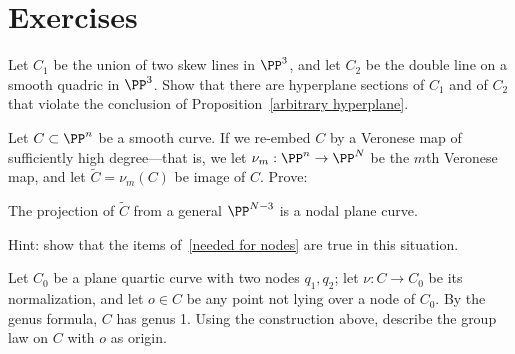 \section{Exercises}
\begin{exercise}\label{{arbitrary hyperplane examples}}
Let $C_1$ be the union of two skew lines in $\PP^3$, and let $C_2$ be the double line on a smooth quadric in $\PP^3$.
Show that there are hyperplane sections of $C_1$ and of $C_2$ that violate the conclusion of Proposition~\ref{arbitrary hyperplane}.
\end{exercise}

\begin{exercise}

Let $C\subset \PP^n$ be a smooth curve. If we re-embed $C$ by a Veronese map of sufficiently high degree---that is, we let $\nu_m : \PP^n \to \PP^N$ be the $m$th Veronese map, and let $\widetilde C = \nu_m(C)$ be image of $C$. Prove:

\begin{proposition}\label{positive characteristic nodes}
The projection of $\widetilde C$ from a general $\PP^{N-3}$ is a nodal plane curve.
\end{proposition}

Hint: show that the items of~\ref{needed for nodes}  are true in this situation.
\end{exercise}

\begin{exercise}
Let $C_0$ be a plane quartic curve with two nodes $q_1, q_2$; let $\nu : C \to C_0$ be its normalization, and let $o \in C$ be any point not lying over a node of $C_0$.
By the genus formula, $C$ has genus 1. Using the construction above, describe the group law on $C$ with $o$ as origin.
\end{exercise}

